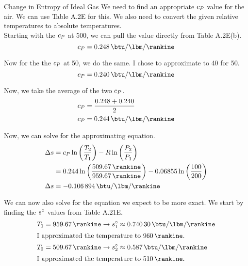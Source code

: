 \begin{example}{Change in Entropy of Ideal Gas}
  We need to find an appropriate $c_{P}$ value for the air. We can use Table A.2E for this.
  We also need to convert the given relative temperatures to absolute temperatures. \\
  Starting with the $c_{P}$ at \SI{500}{\degreeF}, we can pull the value directly from Table A.2E(b).
  \begin{equation*}
    \SpecificHeatPressure = \SI{0.248}{\btu\per\lbm\per\rankine}
  \end{equation*}

  Now for the the $c_{P}$ at \SI{50}{\degreeF}, we do the same.
  I chose to approximate to \SI{40}{\degreeF} for \SI{50}{\degreeF}.
  \begin{equation*}
    \SpecificHeatPressure = \SI{0.240}{\btu\per\lbm\per\rankine}
  \end{equation*}

  Now, we take the average of the two $c_{P}$.
  \begin{align*}
    \SpecificHeatPressure &= \frac{0.248 + 0.240}{2} \\
    \SpecificHeatPressure &= \SI{0.244}{\btu\per\lbm\per\rankine}
  \end{align*}

  Now, we can solve for the approximating equation.
  \begin{align*}
    \Change{\SpecificEntropy} &= \SpecificHeatPressure \ln \left( \frac{\Temp_{2}}{\Temp_{1}} \right) - \GasConstant \ln \left( \frac{\Pressure_{2}}{\Pressure_{1}} \right) \\
                      &= 0.244 \ln \left( \frac{\SI{509.67}{\rankine}}{\SI{959.67}{\rankine}} \right) - 0.06855 \ln \left( \frac{100}{200} \right) \\
    \Change{\SpecificEntropy} &= \SI{-0.106894}{\btu\per\lbm\per\rankine}
  \end{align*}

  We can now also solve for the equation we expect to be more exact.
  We start by finding the $s^{\circ}$ values from Table A.21E.
  \begin{align*}
    \Temp_{1} &= \SI{959.67}{\rankine} \rightarrow \SpecificEntropy_{1}^{\circ} \approx \SI{0.74030}{\btu\per\lbm\per\rankine} \\
    \intertext{I approximated the temperature to \SI{960}{\rankine}.}
    \Temp_{2} &= \SI{509.67}{\rankine} \rightarrow \SpecificEntropy_{2}^{\circ} \approx \SI{0.587}{\btu\per\lbm\per\rankine} \\
    \intertext{I approximated the temperature to \SI{510}{\rankine}.}
  \end{align*}


\end{example}
